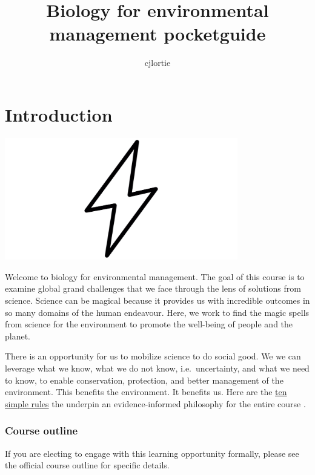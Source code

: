 \documentclass[
]{book}
\title{Biology for environmental management pocketguide}
\author{cjlortie}
\date{}
\begin{document}
\maketitle

{
\setcounter{tocdepth}{1}
\tableofcontents
}
\hypertarget{introduction}{%
\chapter{Introduction}\label{introduction}}

\includegraphics[width=4in,height=\textheight]{./bolt.png}

Welcome to biology for environmental management. The goal of this course is to examine global grand challenges that we face through the lens of solutions from science. Science can be magical because it provides us with incredible outcomes in so many domains of the human endeavour. Here, we work to find the magic spells from science for the environment to promote the well-being of people and the planet.

There is an opportunity for us to mobilize science to do social good. We we can leverage what we know, what we do not know, i.e.~uncertainty, and what we need to know, to enable conservation, protection, and better management of the environment. This benefits the environment. It benefits us. Here are the \href{https://www.facetsjournal.com/doi/10.1139/facets-2020-0021}{ten simple rules} the underpin an evidence-informed philosophy for the entire course \citep{RN6861}.

\hypertarget{course-outline}{%
\subsection*{Course outline}\label{course-outline}}

If you are electing to engage with this learning opportunity formally, please see the official course outline for specific details.
\end{document}
